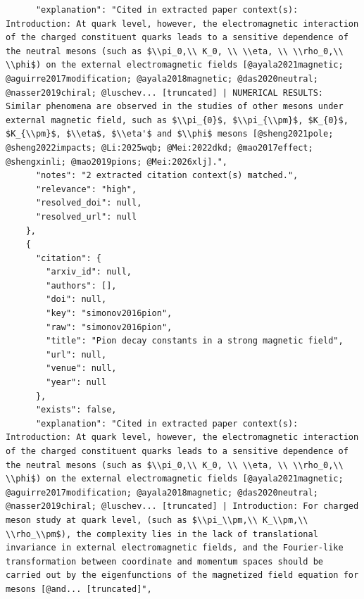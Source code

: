 \documentclass[11pt]{article}
\begin{document}
\begin{verbatim}
      "explanation": "Cited in extracted paper context(s): Introduction: At quark level, however, the electromagnetic interaction of the charged constituent quarks leads to a sensitive dependence of the neutral mesons (such as $\\pi_0,\\ K_0, \\ \\eta, \\ \\rho_0,\\ \\phi$) on the external electromagnetic fields [@ayala2021magnetic; @aguirre2017modification; @ayala2018magnetic; @das2020neutral; @nasser2019chiral; @luschev... [truncated] | NUMERICAL RESULTS: Similar phenomena are observed in the studies of other mesons under external magnetic field, such as $\\pi_{0}$, $\\pi_{\\pm}$, $K_{0}$, $K_{\\pm}$, $\\eta$, $\\eta'$ and $\\phi$ mesons [@sheng2021pole; @sheng2022impacts; @Li:2025wqb; @Mei:2022dkd; @mao2017effect; @shengxinli; @mao2019pions; @Mei:2026xlj].",
      "notes": "2 extracted citation context(s) matched.",
      "relevance": "high",
      "resolved_doi": null,
      "resolved_url": null
    },
    {
      "citation": {
        "arxiv_id": null,
        "authors": [],
        "doi": null,
        "key": "simonov2016pion",
        "raw": "simonov2016pion",
        "title": "Pion decay constants in a strong magnetic field",
        "url": null,
        "venue": null,
        "year": null
      },
      "exists": false,
      "explanation": "Cited in extracted paper context(s): Introduction: At quark level, however, the electromagnetic interaction of the charged constituent quarks leads to a sensitive dependence of the neutral mesons (such as $\\pi_0,\\ K_0, \\ \\eta, \\ \\rho_0,\\ \\phi$) on the external electromagnetic fields [@ayala2021magnetic; @aguirre2017modification; @ayala2018magnetic; @das2020neutral; @nasser2019chiral; @luschev... [truncated] | Introduction: For charged meson study at quark level, (such as $\\pi_\\pm,\\ K_\\pm,\\ \\rho_\\pm$), the complexity lies in the lack of translational invariance in external electromagnetic fields, and the Fourier-like transformation between coordinate and momentum spaces should be carried out by the eigenfunctions of the magnetized field equation for mesons [@and... [truncated]",

\end{verbatim}
\end{document}
